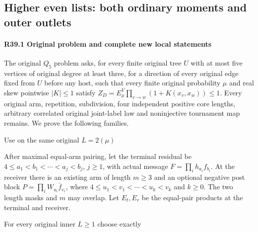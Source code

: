 \subsection{Higher even lists: both ordinary moments and outer outlets}\label{proof:R2-C039}

\paragraph{R39.1 Original problem and complete new local statements}

The original \(Q_{5}\) problem asks, for every finite original tree \(U\) with at most five vertices of original degree at least three, for a direction of every original edge fixed from \(U\) before any host, such that every finite original probability \(\mu\) and real skew pointwise \(\lvert K\rvert \le 1\) satisfy \(Z_D=E_\mu^V \prod_{v\to w}(1+K(x_v,\allowbreak \allowbreak x_w))\le 1\). Every original arm, repetition, subdivision, four independent positive core lengths, arbitrary correlated original joint-label law and noninjective tournament map remains. We prove the following families.

Use on the same original \(L=2(\mu)\)



After maximal equal-arm pairing, let the terminal residual be
\(4\le a_1<b_1<\cdots<a_j<b_j\), \(j\ge1\), with actual message
\(F=\prod_i h_{a_i}f_{b_i}\). At the receiver there is an existing
arm of length \(m\ge3\) and an optional negative post block
\(P=\prod_iW_{u_i}\bar f_{v_i}\), where
\(4\le u_1<v_1<\cdots<u_k<v_k\) and \(k\ge0\).
The two length masks and $m$ may overlap. Let \(E_t,E_r\) be the equal-pair products at
the terminal and receiver.

For every original inner \(L\ge 1\) choose exactly


